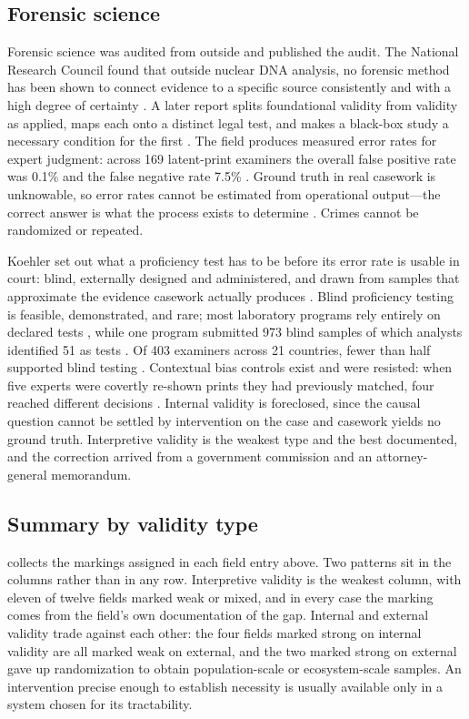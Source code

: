 \documentclass{article}
\begin{document}
\subsection{Forensic science}

Forensic science was audited from outside and published the audit. The National Research Council found that outside nuclear DNA analysis, no forensic method has been shown to connect evidence to a specific source consistently and with a high degree of certainty \citep{nrc2009strengthening}. A later report splits foundational validity from validity as applied, maps each onto a distinct legal test, and makes a black-box study a necessary condition for the first \citep{pcast2016forensic}. The field produces measured error rates for expert judgment: across 169 latent-print examiners the overall false positive rate was 0.1\% and the false negative rate 7.5\% \citep{ulery2011accuracy}. Ground truth in real casework is unknowable, so error rates cannot be estimated from operational output---the correct answer is what the process exists to determine \citep{pcast2016forensic}. Crimes cannot be randomized or repeated.

Koehler set out what a proficiency test has to be before its error rate is usable in court: blind, externally designed and administered, and drawn from samples that approximate the evidence casework actually produces \citep{koehler2013proficiency}. Blind proficiency testing is feasible, demonstrated, and rare; most laboratory programs rely entirely on declared tests \citep{mejia2020implementing}, while one program submitted 973 blind samples of which analysts identified 51 as tests \citep{hundl2020implementation}. Of 403 examiners across 21 countries, fewer than half supported blind testing \citep{kukucka2017cognitive}. Contextual bias controls exist and were resisted: when five experts were covertly re-shown prints they had previously matched, four reached different decisions \citep{dror2006contextual}. Internal validity is foreclosed, since the causal question cannot be settled by intervention on the case and casework yields no ground truth. Interpretive validity is the weakest type and the best documented, and the correction arrived from a government commission and an attorney-general memorandum.

\subsection{Summary by validity type}

 collects the markings assigned in each field entry above. Two patterns sit in the columns rather than in any row. Interpretive validity is the weakest column, with eleven of twelve fields marked weak or mixed, and in every case the marking comes from the field's own documentation of the gap. Internal and external validity trade against each other: the four fields marked strong on internal validity are all marked weak on external, and the two marked strong on external gave up randomization to obtain population-scale or ecosystem-scale samples. An intervention precise enough to establish necessity is usually available only in a system chosen for its tractability.
\end{document}
